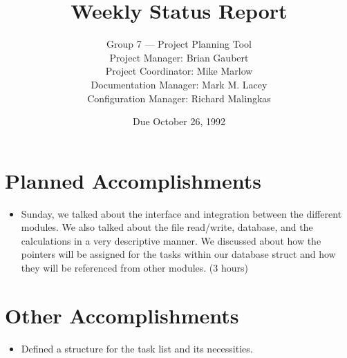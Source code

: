 


\title{Weekly Status Report}

\author{Group 7 --- Project Planning Tool\\
Project Manager: Brian Gaubert\\
Project Coordinator: Mike Marlow\\
Documentation Manager: Mark M. Lacey\\
Configuration Manager: Richard Malingkas}

\date{Due October 26, 1992}

\maketitle

%
%
%
\section{Planned Accomplishments}
\begin{itemize}
	\item Sunday, we talked about the interface and integration
between the different modules. We also talked about the file
read/write, database, and the calculations in a very descriptive
manner. We discussed about how the pointers will be assigned for the
tasks within our database struct and how they will be referenced from
other modules. (3 hours)

\end{itemize}

%
%
%
\section{Other Accomplishments}
\begin{itemize}
	\item Defined a structure for the task list and its necessities.
\end{itemize}

